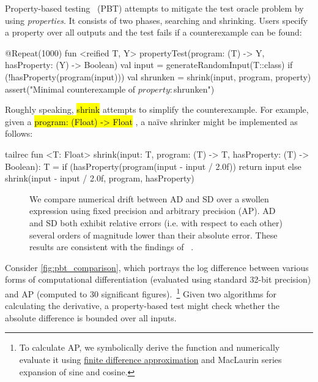 \documentclass[12pt,initial,twoside,maitrise]{dms}
\newcommand{\inline}[1]{%
    \begingroup%
    \sethlcolor{slightgray}%
    \hl{\ttfamily\small #1}%
    \endgroup
}
\numberwithin{equation}{section}
\numberwithin{table}{chapter}
\numberwithin{figure}{chapter}
\begin{document}
Property-based testing~\citep{fink1997property} (PBT) attempts to mitigate the test oracle problem by using \textit{properties}. It consists of two phases, searching and shrinking. Users specify a property over all outputs and the test fails if a counterexample can be found:
%
\begin{kotlinlisting}
@Repeat(1000)
fun <reified T, Y> propertyTest(program: (T) -> Y, hasProperty: (Y) -> Boolean) {
    val input = generateRandomInput(T::class)
    if (!hasProperty(program(input))) {
        val shrunken = shrink(input, program, property)
        assert("Minimal counterexample of $property: $shrunken")
    }
}
\end{kotlinlisting}
%
Roughly speaking, \inline{shrink} attempts to simplify the counterexample. For example, given a \inline{program: (Float) -> Float}, a na\"ive shrinker might be implemented as follows:
%
\begin{kotlinlisting}
tailrec fun <T: Float> shrink(input: T, program: (T) -> T, hasProperty: (T) -> Boolean): T =
    if (hasProperty(program(input - input / 2.0f)) return input
    else shrink(input - input / 2.0f, program, hasProperty)
\end{kotlinlisting}
%
\begin{figure}
\caption{We compare numerical drift between AD and SD over a swollen expression using fixed precision and arbitrary precision (AP). AD and SD both exhibit relative errors (i.e. with respect to each other) several orders of magnitude lower than their absolute error. These results are consistent with the findings of ~\citet{laue2019equivalence}.\vspace{-10pt}}
\label{fig:pbt_comparison}
\end{figure}
%
Consider \autoref{fig:pbt_comparison}, which portrays the log difference between various forms of computational differentiation (evaluated using standard 32-bit precision) and AP (computed to 30 significant figures).~\footnote{To calculate AP, we symbolically derive the function and numerically evaluate it using \hyperref[sec:fdm]{finite difference approximation} and MacLaurin series expansion of sine and cosine.} Given two algorithms for calculating the derivative, a property-based test might check whether the absolute difference is bounded over all inputs.
\end{document}
